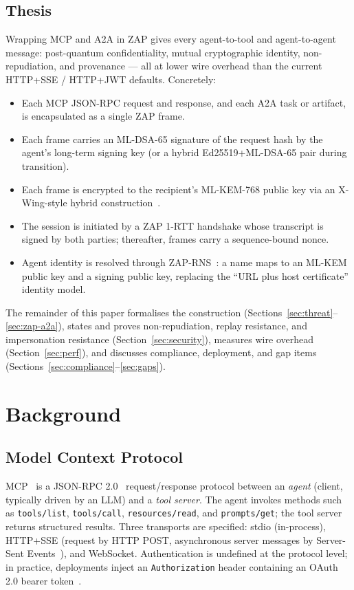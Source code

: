 \documentclass[11pt,a4paper]{article}
\theoremstyle{definition}
\theoremstyle{remark}
\newcommand{\zap}{\textsf{ZAP}\xspace}
\newcommand{\mcp}{\textsf{MCP}\xspace}
\newcommand{\aatwo}{\textsf{A2A}\xspace}
\newcommand{\rns}{\textsf{ZAP-RNS}\xspace}
\begin{document}
\subsection{Thesis}

Wrapping \mcp{} and \aatwo{} in \zap{} gives every agent-to-tool and
agent-to-agent message: post-quantum confidentiality, mutual
cryptographic identity, non-repudiation, and provenance --- all at lower
wire overhead than the current HTTP+SSE / HTTP+JWT defaults. Concretely:

\begin{itemize}[leftmargin=2em,itemsep=0.25em]
\item Each \mcp{} JSON-RPC request and response, and each \aatwo{} task
or artifact, is encapsulated as a single \zap{} frame.
\item Each frame carries an ML-DSA-65 signature of the request hash by
the agent's long-term signing key (or a hybrid Ed25519+ML-DSA-65 pair
during transition).
\item Each frame is encrypted to the recipient's ML-KEM-768 public key
via an X-Wing-style hybrid construction~\cite{kyber2018,nistmlkem}.
\item The session is initiated by a \zap{} 1-RTT handshake whose
transcript is signed by both parties; thereafter, frames carry a
sequence-bound nonce.
\item Agent identity is resolved through \rns{}~\cite{zaprns}: a name
maps to an ML-KEM public key and a signing public key, replacing the
``URL plus host certificate'' identity model.
\end{itemize}

The remainder of this paper formalises the construction
(Sections~\ref{sec:threat}--\ref{sec:zap-a2a}), states and proves
non-repudiation, replay resistance, and impersonation resistance
(Section~\ref{sec:security}), measures wire overhead
(Section~\ref{sec:perf}), and discusses compliance, deployment, and
gap items (Sections~\ref{sec:compliance}--\ref{sec:gaps}).

\section{Background}

\subsection{Model Context Protocol}

\mcp{}~\cite{mcp2024} is a JSON-RPC 2.0~\cite{jsonrpc2} request/response
protocol between an \emph{agent} (client, typically driven by an LLM)
and a \emph{tool server}. The agent invokes methods such as
\texttt{tools/list}, \texttt{tools/call}, \texttt{resources/read}, and
\texttt{prompts/get}; the tool server returns structured results.
Three transports are specified: stdio (in-process), HTTP+SSE (request
by HTTP POST, asynchronous server messages by Server-Sent
Events~\cite{rfc6455}), and WebSocket. Authentication is undefined at
the protocol level; in practice, deployments inject an
\texttt{Authorization} header containing an OAuth 2.0 bearer
token~\cite{rfc6749,rfc7519}.
\end{document}
